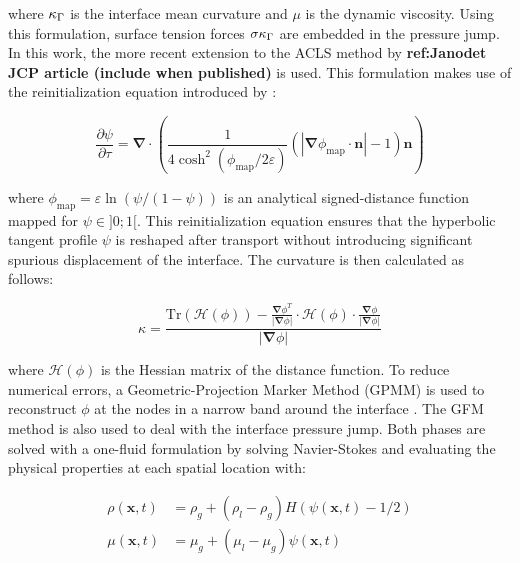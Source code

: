 where $\kappa_{\scriptsize{\Gamma}}$ is the interface mean curvature and $\mu$ is the dynamic viscosity. Using this formulation, surface tension forces $\sigma\kappa_{\scriptsize{\Gamma}}$ are embedded in the pressure jump. \\

In this work, the more recent extension to the ACLS method by \textbf{ref:Janodet JCP article (include when published)} is used. This formulation makes use of the reinitialization equation introduced by :

\begin{equation}
\label{eq:acls_reinit_2017}
\frac{\partial\psi}{\partial \tau}=\boldsymbol{\nabla}\cdot\left(\frac{1}{4\cosh^2{\left(\phi_{\mathrm{map}}/2\varepsilon\right)}}\left(|\boldsymbol{\nabla}\phi_{\mathrm{map}}\cdot\textbf{n}|-1\right)\textbf{n}\right)
\end{equation}

where $\phi_{\mathrm{map}}=\varepsilon\ln\left({\psi}/({1-\psi})\right)$ is an analytical signed-distance function mapped for $\psi \in ]0;1[$. This reinitialization equation ensures that the hyperbolic tangent profile $\psi$ is reshaped after transport without introducing significant spurious displacement of the interface. The curvature is then calculated as follows:

\begin{equation}
\kappa=\frac{\mathrm{Tr}\left(\boldsymbol{\mathcal{H}}(\phi)\right)-\frac{\boldsymbol{\nabla}\phi^T}{|\boldsymbol{\nabla}\phi|}\cdot\boldsymbol{\mathcal{H}}\left(\phi\right)\cdot\frac{\boldsymbol{\nabla}\phi}{|\boldsymbol{\nabla}\phi|}}{|\boldsymbol{\nabla}\phi|}
\label{eq:curvature_Goldman}
\end{equation}

where $\mathcal{H} \left( \phi \right)$ is the Hessian matrix of the distance function. To reduce numerical errors, a Geometric-Projection Marker Method (GPMM) is used to reconstruct $\phi$ at the nodes in a narrow band around the interface . The GFM method is also used to deal with the interface pressure jump. Both phases are solved with a one-fluid formulation by solving Navier-Stokes and evaluating the physical properties at each spatial location with:

\begin{subequations}
\begin{align}
\rho(\textbf{x},t) &= \rho_g+(\rho_l-\rho_g)H(\psi(\textbf{x},t)-1/2)  \\
\mu(\textbf{x},t) &= \mu_g+(\mu_l-\mu_g)\psi(\textbf{x},t)
\end{align}
\end{subequations}

